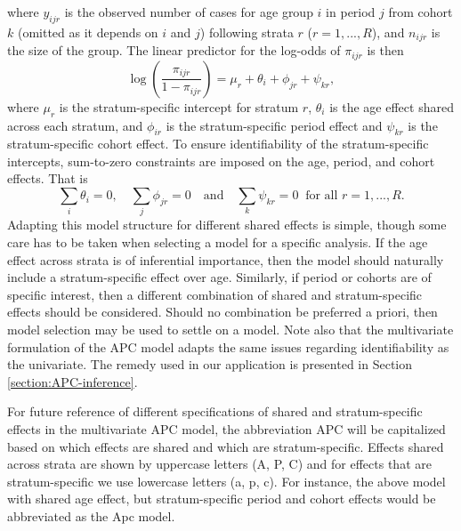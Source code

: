 where $y_{ijr}$ is the observed number of cases for age group $i$ in period $j$ from cohort $k$ (omitted as it depends on $i$ and $j$) following strata $r$ ($r=1,...,R$), and $n_{ijr}$ is the size of the group. The linear predictor for the log-odds of $\pi_{ijr}$ is then
\begin{equation}
    \log\left(\frac{\pi_{ijr}}{1-\pi_{ijr}}\right) = \mu_r + \theta_i + \phi_{jr} + \psi_{kr},
    \label{eqn:linear-predictor}
\end{equation}
where $\mu_r$ is the stratum-specific intercept for stratum $r$, $\theta_i$ is the 
age effect shared across each stratum, and $\phi_{ir}$ is the stratum-specific period effect and $\psi_{kr}$ is the stratum-specific cohort effect. To ensure identifiability of the stratum-specific intercepts, sum-to-zero constraints are imposed on the age, period, and cohort effects. That is
\begin{equation}
    \sum_{i}\theta_i=0,\quad \sum_j\phi_{jr}=0\quad \text{and}\quad \sum_k\psi_{kr}=0\;\; \text{for all } r = 1,...,R.
\end{equation}
Adapting this model structure for different shared effects is simple, though some care has to be taken when selecting a model for a specific analysis. If the age effect across strata is of inferential importance, then the model should naturally include a stratum-specific effect over age. Similarly, if period or cohorts are of specific interest, then a different combination of shared and stratum-specific effects should be considered. Should no combination be preferred a priori, then model selection may be used to settle on a model. Note also that the multivariate formulation of the APC model adapts the same issues regarding identifiability as the univariate. The remedy used in our application is presented in Section \ref{section:APC-inference}.

For future reference of different specifications of shared and stratum-specific effects in the multivariate APC model, the abbreviation APC will be capitalized based on which effects are shared and which are stratum-specific. Effects shared across strata are shown by uppercase letters (A, P, C) and for effects that are stratum-specific we use lowercase letters (a, p, c). For instance, the above model with shared age effect, but stratum-specific period and cohort effects would be abbreviated as the Apc model. 

